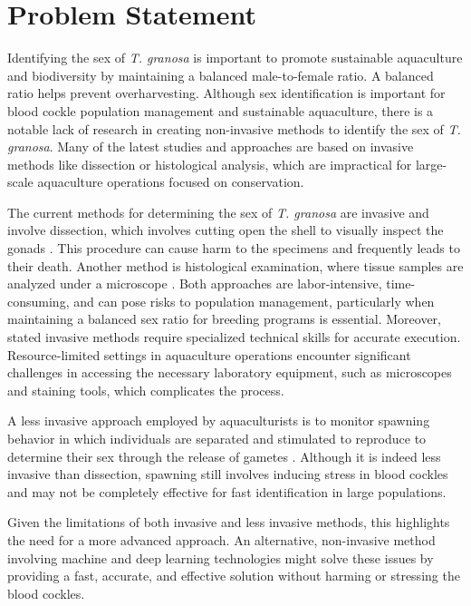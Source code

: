 \section{Problem Statement}

Identifying the sex of \textit{T. granosa} is important to promote sustainable aquaculture and biodiversity by maintaining a balanced male-to-female ratio. A balanced ratio helps prevent overharvesting. Although sex identification is important for blood cockle population management and sustainable aquaculture, there is a notable lack of research in creating non-invasive methods to identify the sex of \textit{T. granosa}. Many of the latest studies and approaches are based on invasive methods like dissection or histological analysis, which are impractical for large-scale aquaculture operations focused on conservation.

The current methods for determining the sex of \textit{T. granosa} are invasive and  involve dissection, which involves cutting open the shell to visually inspect the gonads \cite{erica2018}. This procedure can cause harm to the specimens and frequently leads to their death. Another method is histological examination, where tissue samples are analyzed under a microscope \cite{may2021}. Both approaches are labor-intensive, time-consuming, and can pose risks to population management, particularly when maintaining a balanced sex ratio for breeding programs is essential. Moreover, stated invasive methods require specialized technical skills for accurate execution. Resource-limited settings in aquaculture operations encounter significant challenges in accessing the necessary laboratory equipment, such as microscopes and staining tools, which complicates the process.

A less invasive approach employed by aquaculturists is to monitor spawning behavior in which individuals are separated and stimulated to reproduce to determine their sex through the release of gametes \cite{miranda2023}. Although it is indeed less invasive than dissection, spawning still involves inducing stress in blood cockles and may not be completely effective for fast identification in large populations.

Given the limitations of both invasive and less invasive methods, this highlights the need for a more advanced approach. An alternative, non-invasive method involving machine and deep learning technologies might solve these issues by providing a fast, accurate, and effective solution without harming or stressing the blood cockles.

